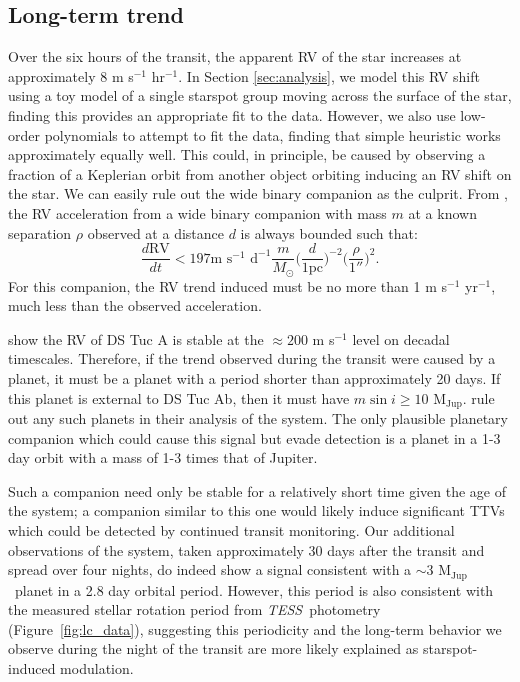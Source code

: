 \documentclass[twocolumn]{aastex63}
\newcommand{\tess}{{\it TESS}}
\newcommand{\mjup}{{M$_\textrm{Jup}$}}
\begin{document}
\subsection{Long-term trend}
\label{sec:trend}

Over the six hours of the transit, the apparent RV of the star increases at approximately 8 m s$^{-1}$ hr$^{-1}$. 
In Section \ref{sec:analysis}, we model this RV shift using a toy model of a single 
starspot group moving across the surface of the star, finding this provides an appropriate fit to the data. 
However, we also use low-order polynomials to attempt to fit the data, finding that simple heuristic works approximately equally well.
This could, in principle, be caused by observing a fraction of a Keplerian orbit from another object orbiting inducing an RV shift on the star. 
We can easily rule out the wide binary companion as the culprit.
From \citet{Liu02}, the RV acceleration from a wide binary companion with mass $m$ at a known separation $\rho$ observed at a distance $d$ is always bounded such that:
\begin{equation}
    \frac{d\textrm{RV}}{dt} < 197 \textrm{m } \textrm{s}^{-1} \textrm{ d}^{-1}
    \frac{m}{M_\odot} \bigg(\frac{d}{1\textrm{pc}}\bigg)^{-2} \bigg(\frac{\rho}{1''}\bigg)^{2}.
\end{equation}
For this companion, the RV trend induced must be no more than 1 m s$^{-1}$ yr$^{-1}$, much less than the observed acceleration.

\citet{Benatti19} show the RV of DS Tuc A is stable at the $\approx 200$ m s$^{-1}$ level on decadal timescales. 
Therefore, if the trend observed during the transit were caused by a planet, it must be a planet with a period shorter than approximately 20 days. 
If this planet is external to DS Tuc Ab, then it must have $m \sin i \geq 10$ \mjup. 
\citet{Benatti19} rule out any such planets in their analysis of the system.
The only plausible planetary companion which could cause this signal but evade detection is a planet in a 1-3 day orbit with a mass of 1-3 times that of Jupiter. 

Such a companion need only be stable for a relatively short time given the age of the system; a companion similar to this one would likely induce significant TTVs which could be detected by continued transit monitoring.
Our additional observations of the system, taken approximately 30 days after the transit and spread over four nights, do indeed show a signal consistent with a $\sim 3$ \mjup\ planet in a 2.8 day orbital period. However, this period is also consistent with the measured stellar rotation period from \tess\ photometry (Figure~\ref{fig:lc_data}), suggesting this periodicity and the long-term behavior we observe during the night of the transit are more likely explained as starspot-induced modulation.
\end{document}
